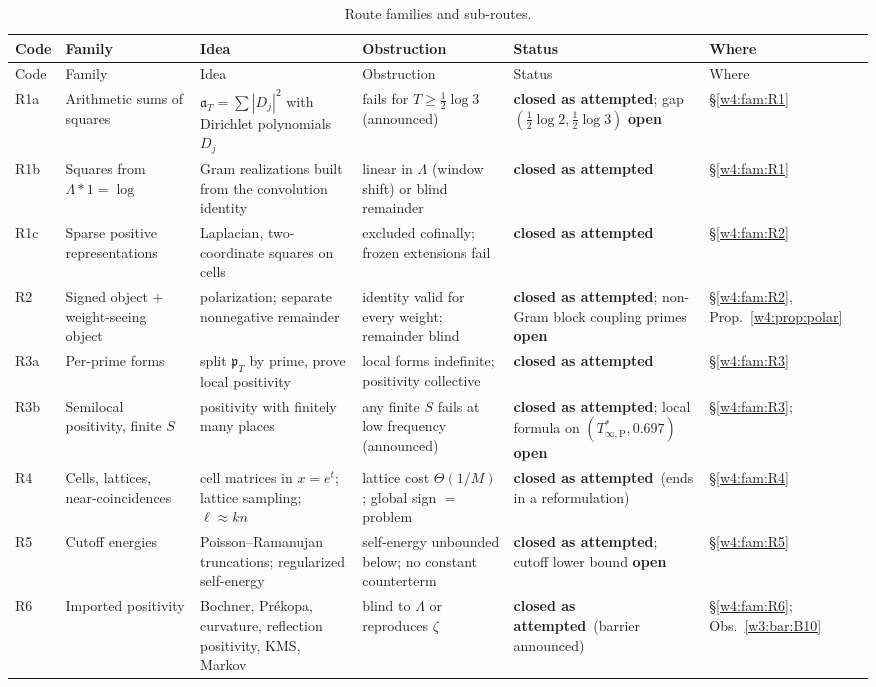 \documentclass[11pt]{amsart}
\theoremstyle{definition}
\theoremstyle{remark}
\numberwithin{equation}{section}
\newcommand{\pT}{\mathfrak{p}_T}                       %
\newcommand{\aT}{\mathfrak{a}_T}                       %
\newcommand{\Tarch}{T^{*}_{\infty,\mathrm P}}          %
\newcommand{\rtag}[1]{\textbf{\small\textsf{#1}}}
\newcommand{\closedA}{\rtag{closed as attempted}}
\newcommand{\openR}{\rtag{open}}
\begin{document}
{\small
\setlength{\tabcolsep}{3pt}
\begin{longtable}{>{\raggedright}p{0.9cm}>{\raggedright}p{2.6cm}>{\raggedright}p{3.2cm}>{\raggedright}p{3.6cm}>{\raggedright}p{2.4cm}>{\raggedright\arraybackslash}p{1.9cm}}
\caption{Route families and sub-routes.}\label{w8:tab:master}\\
\toprule
Code & Family & Idea & Obstruction & Status & Where\\\midrule\endfirsthead
\toprule
Code & Family & Idea & Obstruction & Status & Where\\\midrule\endhead
\bottomrule\endfoot
R1a & Arithmetic sums of squares & $\aT=\sum|D_j|^2$ with Dirichlet polynomials $D_j$ & fails for $T\ge\frac12\log3$ (announced) & \closedA; gap $(\frac12\log2,\frac12\log3)$ \openR & \S\ref{w4:fam:R1}\\
R1b & Squares from $\Lambda*1=\log$ & Gram realizations built from the convolution identity & linear in $\Lambda$ (window shift) or blind remainder & \closedA & \S\ref{w4:fam:R1}\\
R1c & Sparse positive representations & Laplacian, two-coordinate squares on cells & excluded cofinally; frozen extensions fail & \closedA & \S\ref{w4:fam:R2}\\
R2 & Signed object $+$ weight-seeing object & polarization; separate nonnegative remainder & identity valid for every weight; remainder blind & \closedA; non-Gram block coupling primes \openR & \S\ref{w4:fam:R2}, Prop.~\ref{w4:prop:polar}\\
R3a & Per-prime forms & split $\pT$ by prime, prove local positivity & local forms indefinite; positivity collective & \closedA & \S\ref{w4:fam:R3}\\
R3b & Semilocal positivity, finite $S$ & positivity with finitely many places & any finite $S$ fails at low frequency (announced) & \closedA; local formula on $(\Tarch,0.697)$ \openR & \S\ref{w4:fam:R3}; \cite{P43,P44,P45}\\
R4 & Cells, lattices, near-coincidences & cell matrices in $x=e^t$; lattice sampling; $\ell\approx kn$ & lattice cost $\Theta(1/M)$; global sign $=$ problem & \closedA\ (ends in a reformulation) & \S\ref{w4:fam:R4}\\
R5 & Cutoff energies & Poisson--Ramanujan truncations; regularized self-energy & self-energy unbounded below; no constant counterterm & \closedA; cutoff lower bound \openR & \S\ref{w4:fam:R5}\\
R6 & Imported positivity & Bochner, Pr\'ekopa, curvature, reflection positivity, KMS, Markov & blind to $\Lambda$ or reproduces $\zeta$ & \closedA\ (barrier announced) & \S\ref{w4:fam:R6}; Obs.~\ref{w3:bar:B10}\\

\end{longtable}}
\end{document}

